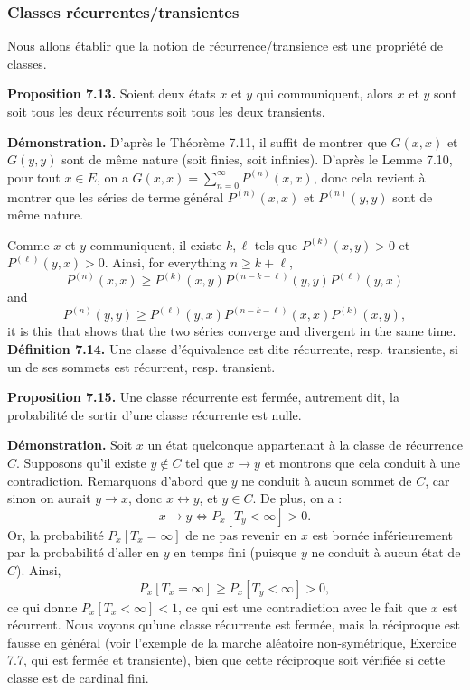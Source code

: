 \subsubsection{Classes récurrentes/transientes}
Nous allons établir que la notion de récurrence/transience est une propriété de classes.

\textbf{Proposition 7.13.} Soient deux états \(x\) et \(y\) qui communiquent, alors \(x\) et \(y\) sont soit tous les deux récurrents soit tous les deux transients.

\textbf{Démonstration.} D’après le Théorème 7.11, il suffit de montrer que \(G(x, x)\) et \(G(y, y)\) sont de même nature (soit finies, soit infinies). D’après le Lemme 7.10, pour tout \(x \in E\), on a \(G(x, x) = \sum_{n=0}^{\infty} P^{(n)}(x, x)\), donc cela revient à montrer que les séries de terme général \(P^{(n)}(x, x)\) et \(P^{(n)}(y, y)\) sont de même nature.

Comme \(x\) et \(y\) communiquent, il existe \(k, \ell\) tels que \(P^{(k)}(x, y) > 0\) et \(P^{(\ell)}(y, x) > 0\). Ainsi, for everything \(n \geq k + \ell\), \[ P^{(n)}(x, x) \geq P^{(k)}(x, y) P^{(n-k-\ell)}(y, y) P^{(\ell)}(y, x) \] and \[ P^{(n)}(y, y) \geq P^{(\ell)}(y, x) P^{(n-k-\ell)}(x, x) P^{(k)}(x, y), \] it is this that shows that the two séries converge and divergent in the same time.
\textbf{Définition 7.14.} Une classe d’équivalence est dite récurrente, resp. transiente, si un de ses sommets est récurrent, resp. transient.

\textbf{Proposition 7.15.} Une classe récurrente est fermée, autrement dit, la probabilité de sortir d’une classe récurrente est nulle.

\textbf{Démonstration.} Soit \(x\) un état quelconque appartenant à la classe de récurrence \(C\). Supposons qu’il existe \(y \notin C\) tel que \(x \to y\) et montrons que cela conduit à une contradiction. Remarquons d’abord que \(y\) ne conduit à aucun sommet de \(C\), car sinon on aurait \(y \to x\), donc \(x \leftrightarrow y\), et \(y \in C\). De plus, on a :
\[
x \to y \iff P_x[T_y < \infty] > 0.
\]
Or, la probabilité \(P_x[T_x = \infty]\) de ne pas revenir en \(x\) est bornée inférieurement par la probabilité d’aller en \(y\) en temps fini (puisque \(y\) ne conduit à aucun état de \(C\)). Ainsi,
\[
P_x[T_x = \infty] \geq P_x[T_y < \infty] > 0,
\]
ce qui donne \(P_x[T_x < \infty] < 1\), ce qui est une contradiction avec le fait que \(x\) est récurrent. 
Nous voyons qu’une classe récurrente est fermée, mais la réciproque est fausse en général (voir l’exemple de la marche aléatoire non-symétrique, Exercice 7.7, qui est fermée et transiente), bien que cette réciproque soit vérifiée si cette classe est de cardinal fini.

